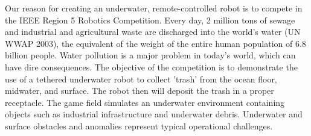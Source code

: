 Our reason for creating an underwater, remote-controlled robot is to compete in the IEEE Region 5 Robotics Competition. Every day, 2 million tons of sewage and industrial and agricultural waste are discharged into the world's water (UN WWAP 2003), the equivalent of the weight of the entire human population of 6.8 billion people. Water pollution is a major problem in today's world, which can have dire consequences. The objective of the competition is to demonstrate the use of a tethered underwater robot to collect 'trash' from the ocean floor, midwater, and surface. The robot then will deposit the trash in a proper receptacle. The game field simulates an underwater environment containing objects such as industrial infrastructure and underwater debris. Underwater and surface obstacles and anomalies represent typical operational challenges. 